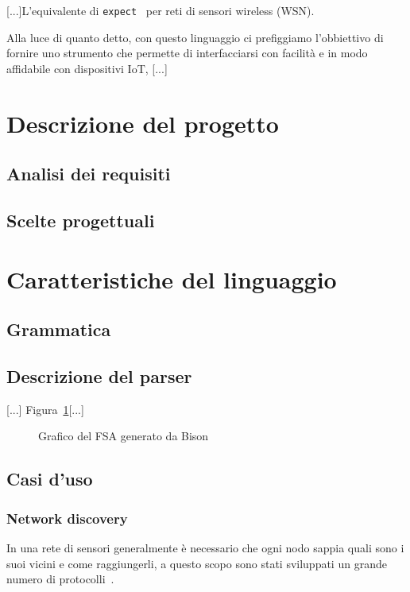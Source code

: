 \documentclass[]{article}
\begin{document}
[...]L'equivalente di \texttt{expect}~\cite{libes1991expect, libes1990expect} per reti di sensori wireless (WSN).

Alla luce di quanto detto, con questo linguaggio ci prefiggiamo l'obbiettivo di fornire uno strumento che permette di interfacciarsi con facilità e in modo affidabile con dispositivi IoT, [...]

\section{Descrizione del progetto}\label{section:descrizione}
\subsection{Analisi dei requisiti}
\subsection{Scelte progettuali}
\section{Caratteristiche del linguaggio}\label{section:caratteristiche-linguaggio}
\subsection{Grammatica}
\subsection{Descrizione del parser}
{[...]} Figura~\ref{fig:parser}[...]
\begin{figure}
	\centering
	\caption{Grafico del FSA generato da Bison}
	\label{fig:parser}
\end{figure}

\subsection{Casi d'uso}\label{subsection:casi-d_uso}
\subsubsection{Network discovery}\label{subsubsection:net-disc}
In una rete di sensori generalmente è necessario che ogni nodo sappia quali sono i suoi vicini e come raggiungerli, a questo scopo sono stati sviluppati un grande numero di protocolli~\cite{narten1998neighbor, kandhalu2010u, alsa2012secure}.
\end{document}
